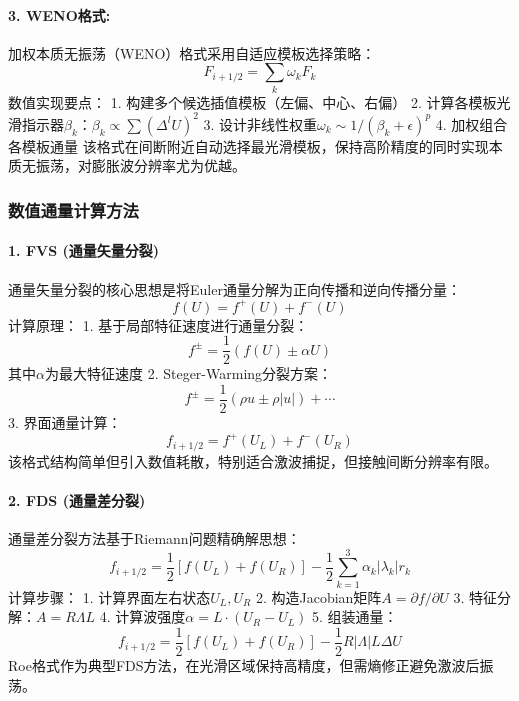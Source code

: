 \documentclass[UTF8]{ctexart}
\begin{document}
\paragraph{3. WENO格式:}
加权本质无振荡（WENO）格式采用自适应模板选择策略：
\begin{equation}
F_{i+1/2} = \sum_{k} \omega_k F_k
\end{equation}
数值实现要点：
1. 构建多个候选插值模板（左偏、中心、右偏）
2. 计算各模板光滑指示器$\beta_k$：$\beta_k \propto \sum (\Delta^l U)^2$
3. 设计非线性权重$\omega_k \sim 1/(\beta_k + \epsilon)^p$
4. 加权组合各模板通量
该格式在间断附近自动选择最光滑模板，保持高阶精度的同时实现本质无振荡，对膨胀波分辨率尤为优越。


\subsubsection{数值通量计算方法}
\paragraph{1. FVS (通量矢量分裂)}
通量矢量分裂的核心思想是将Euler通量分解为正向传播和逆向传播分量：
\begin{equation}
f(U) = f^+(U) + f^-(U)
\end{equation}
计算原理：
1. 基于局部特征速度进行通量分裂：
\begin{equation}
f^{\pm} = \frac{1}{2}(f(U) \pm \alpha U)
\end{equation}
其中$\alpha$为最大特征速度
2. Steger-Warming分裂方案：
\begin{equation}
f^{\pm} = \frac{1}{2}\left(\rho u \pm \rho |u|\right) + \cdots
\end{equation}
3. 界面通量计算：
\begin{equation}
f_{i+1/2} = f^+(U_L) + f^-(U_R)
\end{equation}
该格式结构简单但引入数值耗散，特别适合激波捕捉，但接触间断分辨率有限。

\paragraph{2. FDS (通量差分裂)}
通量差分裂方法基于Riemann问题精确解思想：
\begin{equation}
f_{i+1/2} = \frac{1}{2}\left[f(U_L) + f(U_R)\right] - \frac{1}{2}\sum_{k=1}^{3} \alpha_k |\lambda_k| r_k
\end{equation}
计算步骤：
1. 计算界面左右状态$U_L, U_R$
2. 构造Jacobian矩阵$A = \partial f/\partial U$
3. 特征分解：$A = R\Lambda L$
4. 计算波强度$\alpha = L \cdot (U_R - U_L)$
5. 组装通量：
\begin{equation}
f_{i+1/2} = \frac{1}{2}[f(U_L) + f(U_R)] - \frac{1}{2}R|\Lambda|L \Delta U
\end{equation}
Roe格式作为典型FDS方法，在光滑区域保持高精度，但需熵修正避免激波后振荡。
\end{document}
